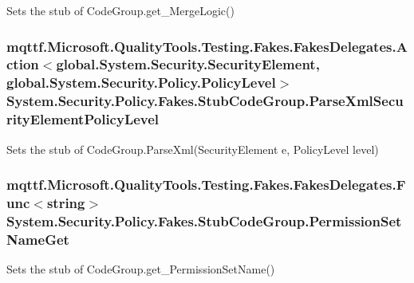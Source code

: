 Sets the stub of Code\-Group.\-get\-\_\-\-Merge\-Logic()

\hypertarget{class_system_1_1_security_1_1_policy_1_1_fakes_1_1_stub_code_group_a71e9b704f10747076f6672e9ab1f397c}{
\subsubsection[{Parse\-Xml\-Security\-Element\-Policy\-Level}]{\setlength{\rightskip}{0pt plus 5cm}mqttf.\-Microsoft.\-Quality\-Tools.\-Testing.\-Fakes.\-Fakes\-Delegates.\-Action$<$global.\-System.\-Security.\-Security\-Element, global.\-System.\-Security.\-Policy.\-Policy\-Level$>$ System.\-Security.\-Policy.\-Fakes.\-Stub\-Code\-Group.\-Parse\-Xml\-Security\-Element\-Policy\-Level}}\label{class_system_1_1_security_1_1_policy_1_1_fakes_1_1_stub_code_group_a71e9b704f10747076f6672e9ab1f397c}


Sets the stub of Code\-Group.\-Parse\-Xml(\-Security\-Element e, Policy\-Level level)

\hypertarget{class_system_1_1_security_1_1_policy_1_1_fakes_1_1_stub_code_group_a32eefe0d7c0e7c6b31cc83e0e0996770}{
\subsubsection[{Permission\-Set\-Name\-Get}]{\setlength{\rightskip}{0pt plus 5cm}mqttf.\-Microsoft.\-Quality\-Tools.\-Testing.\-Fakes.\-Fakes\-Delegates.\-Func$<$string$>$ System.\-Security.\-Policy.\-Fakes.\-Stub\-Code\-Group.\-Permission\-Set\-Name\-Get}}\label{class_system_1_1_security_1_1_policy_1_1_fakes_1_1_stub_code_group_a32eefe0d7c0e7c6b31cc83e0e0996770}


Sets the stub of Code\-Group.\-get\-\_\-\-Permission\-Set\-Name()

